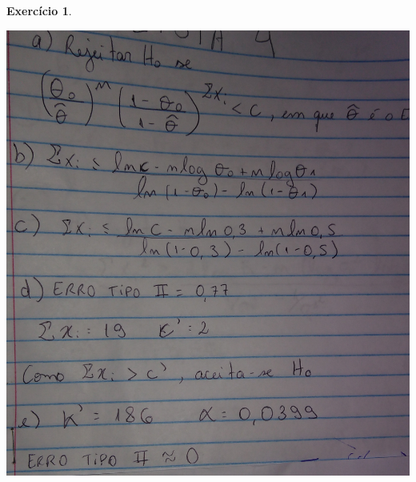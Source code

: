 \documentclass[letter,11pt]{article}
\newtheorem{exer}{Exercício}
\begin{document}
\begin{exer} \rm 

% 
% 
% 
% 
% 
\end{exer}
\includegraphics[scale=0.1]{Ex9_gabarito}
\end{document}
